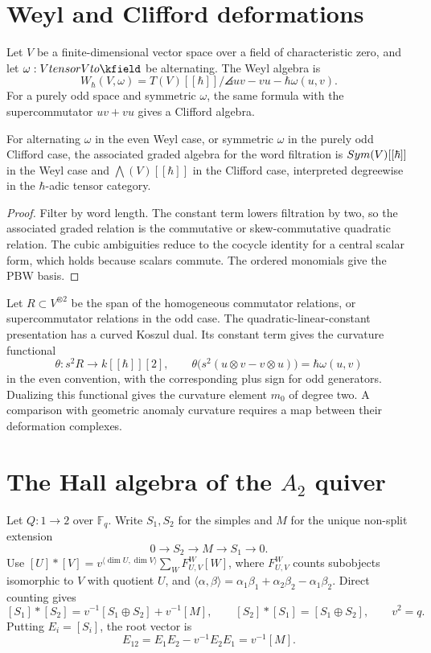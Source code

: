 \section{Weyl and Clifford deformations}
Let $V$ be a finite-dimensional vector space over a field of characteristic zero, and let $\omega:V\tensor V\to\kfield$ be alternating. The Weyl algebra is
\[
 W_\hbar(V,\omega)=T(V)[[\hbar]]/
 \angles{uv-vu-\hbar\omega(u,v)}.
\]
For a purely odd space and symmetric $\omega$, the same formula with the supercommutator $uv+vu$ gives a Clifford algebra.

\begin{theorem}
For alternating $\omega$ in the even Weyl case, or symmetric $\omega$ in the purely odd Clifford case, the associated graded algebra for the word filtration is $Sym(V)[[\hbar]]$ in the Weyl case and $\bigwedge(V)[[\hbar]]$ in the Clifford case, interpreted degreewise in the $\hbar$-adic tensor category.
\end{theorem}
\begin{proof}
Filter by word length. The constant term lowers filtration by two, so the associated graded relation is the commutative or skew-commutative quadratic relation. The cubic ambiguities reduce to the cocycle identity for a central scalar form, which holds because scalars commute. The ordered monomials give the PBW basis.
\end{proof}

Let $R\subset V^{\otimes2}$ be the span of the homogeneous commutator
relations, or supercommutator relations in the odd case.
The quadratic-linear-constant presentation has a curved Koszul dual.
Its constant term gives the curvature functional
\[
 \theta:s^2R\longrightarrow k[[\hbar]][2],\qquad
 \theta\bigl(s^2(u\otimes v-v\otimes u)\bigr)=\hbar\omega(u,v)
\]
in the even convention, with the corresponding plus sign for odd generators.
Dualizing this functional gives the curvature element $m_0$ of degree two.
A comparison with geometric anomaly curvature requires a map between their deformation complexes.


\section{The Hall algebra of the \texorpdfstring{$A_2$}{A2} quiver}
Let $Q:1\to2$ over $\mathbb F_q$. Write $S_1,S_2$ for the simples and $M$ for the unique non-split extension
\[
 0\to S_2\to M\to S_1\to0.
\]
Use $[U]*[V]=v^{\langle\dim U,\dim V\rangle}
\sum_W F_{U,V}^W[W]$, where $F_{U,V}^W$ counts subobjects isomorphic to $V$
with quotient $U$, and
$\langle\alpha,\beta\rangle=\alpha_1\beta_1+\alpha_2\beta_2-\alpha_1\beta_2$.
Direct counting gives
\[
 [S_1]*[S_2]=v^{-1}[S_1\oplus S_2]+v^{-1}[M],
 \qquad
 [S_2]*[S_1]=[S_1\oplus S_2],
 \qquad v^2=q.
\]
Putting $E_i=[S_i]$, the root vector is
\[
 E_{12}=E_1E_2-v^{-1}E_2E_1=v^{-1}[M].
\]

